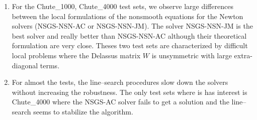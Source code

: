 \begin{enumerate}
\item For the Chute\_1000, Chute\_4000 test sets, we observe large differences between the local formulations of the nonsmooth equations for the Newton solvers ({\sf NSGS-NSN-AC} or {\sf NSGS-NSN-JM}). The solver {\sf NSGS-NSN-JM} is the best solver and really better than {\sf NSGS-NSN-AC} although their theoretical formulation are very close. Theses two test sets are characterized by difficult local problems where the Delassus matrix  $W$ is unsymmetric with large extra-diagonal terms.
\item For almost the tests, the line--search procedures slow down the solvers without increasing the robustness. The only test sets where is has interest is Chute\_4000 where the {\sf NSGS-AC} solver fails to get a solution and the line--search seems to stabilize the algorithm.
\end{enumerate}
